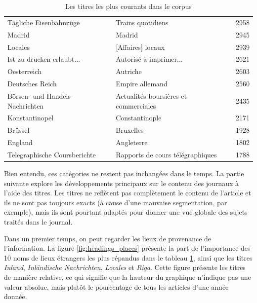 \documentclass[a4paper,twoside,12pt]{article}
\begin{document}
\begin{table}[h]
\begin{tabular}{llr}
         Tägliche Eisenbahnzüge &                     Trains quotidiens &      2958 \\
                         Madrid &                                Madrid &      2945 \\
                        Locales &                     [Affaires] locaux &      2939 \\
      Ist zu drucken erlaubt... &                Autorisé à imprimer... &      2621 \\
                    Oesterreich &                              Autriche &      2603 \\
                Deutsches Reich &                       Empire allemand &      2560 \\
Börsen- und Handels-Nachrichten & Actualités boursières et commerciales &      2435 \\
                 Konstantinopel &                        Constantinople &      2171 \\
                        Brüssel &                             Bruxelles &      1928 \\
                        England &                            Angleterre &      1802 \\
   Telegraphische Coursberichte &      Rapports de cours télégraphiques &      1788 \\
\bottomrule
\end{tabular}
    \caption{Les titres les plus courants dans le corpus}
    \label{tab:common_headings}
\end{table}

Bien entendu, ces catégories ne restent pas inchangées dans le temps. La partie suivante explore les développements principaux sur le contenu des journaux à l'aide des titres. Les titres ne reflètent pas complètement le contenu de l'article et ils ne sont pas toujours exacts (à cause d'une mauvaise segmentation, par exemple), mais ils sont pourtant adaptés pour donner une vue globale des sujets traités dans le journal.

Dans un premier temps, on peut regarder les lieux de provenance de l'information. La figure \ref{fig:headings_places} présente la part de l'importance des 10 noms de lieux étrangers les plus répandus dans le tableau \ref{tab:common_headings}, ainsi que les titres \textit{Inland}, \textit{Inländische Nachrichten}, \textit{Locales} et \textit{Riga}. Cette figure présente les titres de manière relative, ce qui signifie que la hauteur du graphique n'indique pas une valeur absolue, mais plutôt le pourcentage de tous les articles d'une année donnée.
\end{document}
